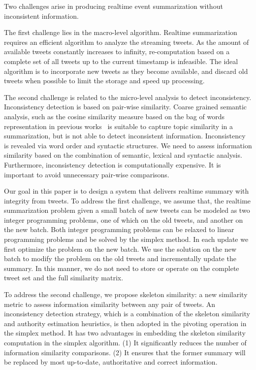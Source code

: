 \documentclass{llncs}
\begin{document}
Two challenges arise in producing realtime event summarization without inconsistent information.

The first challenge lies in the macro-level algorithm. Realtime summarization requires an efficient algorithm to analyze the streaming tweets. As the amount of available tweets constantly increases to infinity, re-computation based on a complete set of all tweets up to the current timestamp is infeasible. The ideal algorithm is to  incorporate new tweets as they become available, and discard old tweets when possible to limit the storage and speed up processing.

The second challenge is related to the micro-level analysis to detect inconsistency. Inconsistency detection is based on pair-wise similarity. Coarse grained semantic analysis, such as the cosine similarity measure based on the bag of words representation in previous works~\cite{Takamura2011Summarizing,Lin2012Generating,Rudra2015Extracting,Shou2013Sumblr,Liu2016LEDS,Gillani2017Post,Zubiaga2012Towards,Sharifi2010Summarizing} is suitable to capture topic similarity in a summarization, but is not able to detect inconsistent information. Inconsistency is revealed via word order and syntactic structures. We need to assess information similarity based on the combination of semantic, lexical and syntactic analysis. Furthermore, inconsistency detection is computationally expensive. It is important to avoid unnecessary pair-wise comparisons.

Our goal in this paper is to design a system that delivers realtime summary with integrity from tweets. To address the first challenge, we assume that, the realtime summarization problem given a small batch of new tweets can be modeled as two integer programming problems, one of which on the old tweets, and another on the new batch. Both integer programming problems can be relaxed to linear programming problems and be solved by the simplex method. In each update we first optimize the problem on the new batch. We use the solution on the new batch to modify the problem on the old tweets and incrementally update the summary.  In this manner, we do not need to store or operate on the complete tweet set and the full similarity matrix.


To address the second challenge, we propose skeleton similarity: a new similarity metric to assess information similarity between any pair of tweets. An inconsistency detection strategy, which is a combination of the skeleton similarity and authority estimation heuristics, is then adopted in the pivoting operation in the simplex method. It has two advantages in embedding the skeleton similarity computation in the simplex algorithm. (1) It significantly reduces the number of information similarity comparisons. (2) It ensures that the former summary will be replaced by most up-to-date, authoritative and correct information.
\end{document}
